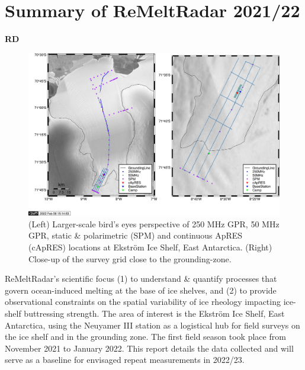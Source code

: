 \documentclass[a4paper,12pt]{article}
\begin{document}
\section{Summary of ReMeltRadar 2021/22}
\textbf{RD}

\begin{figure}
  \includegraphics[width=\linewidth]{Figures/Overview.png}
  \caption{(Left) Larger-scale bird's eyes perspective of 250 MHz GPR, 50 MHz GPR, static \& polarimetric (SPM) and continuous ApRES (cApRES) locations at Ekström Ice Shelf, East Antarctica. (Right) Close-up of the survey grid close to the grounding-zone.}
  \label{fig:overview}
\end{figure}
ReMeltRadar's scientific focus (1) to understand \& quantify processes that
govern ocean-induced melting at the base of ice shelves, and (2) to provide
observational constraints on the spatial variability of ice rheology impacting
ice-shelf buttressing strength. The area of interest is the Ekström Ice Shelf,
East Antarctica, using the Neuyamer III station as a logistical hub for field
surveys on the ice shelf and in the grounding zone. The first field season took
place from November 2021 to January 2022. This report details the data collected
and will serve as a baseline for envisaged repeat measurements in 2022/23. 
\pagebreak
\end{document}
